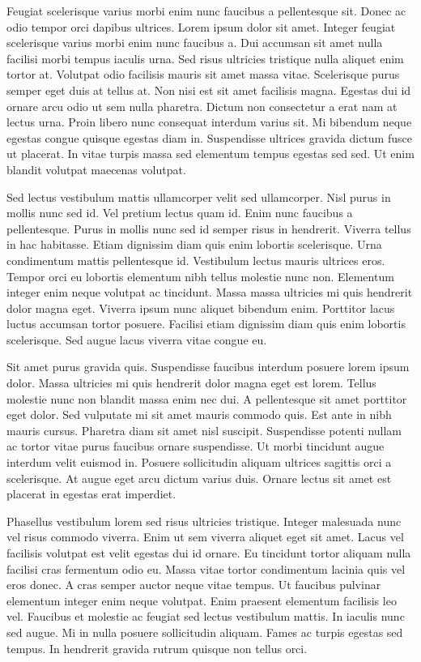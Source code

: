 \documentclass[11pt,a4paper]{article}
\begin{document}
Feugiat scelerisque varius morbi enim nunc faucibus a pellentesque sit. Donec ac odio tempor orci dapibus ultrices. Lorem ipsum dolor sit amet. Integer feugiat scelerisque varius morbi enim nunc faucibus a. Dui accumsan sit amet nulla facilisi morbi tempus iaculis urna. Sed risus ultricies tristique nulla aliquet enim tortor at. Volutpat odio facilisis mauris sit amet massa vitae. Scelerisque purus semper eget duis at tellus at. Non nisi est sit amet facilisis magna. Egestas dui id ornare arcu odio ut sem nulla pharetra. Dictum non consectetur a erat nam at lectus urna. Proin libero nunc consequat interdum varius sit. Mi bibendum neque egestas congue quisque egestas diam in. Suspendisse ultrices gravida dictum fusce ut placerat. In vitae turpis massa sed elementum tempus egestas sed sed. Ut enim blandit volutpat maecenas volutpat.

Sed lectus vestibulum mattis ullamcorper velit sed ullamcorper. Nisl purus in mollis nunc sed id. Vel pretium lectus quam id. Enim nunc faucibus a pellentesque. Purus in mollis nunc sed id semper risus in hendrerit. Viverra tellus in hac habitasse. Etiam dignissim diam quis enim lobortis scelerisque. Urna condimentum mattis pellentesque id. Vestibulum lectus mauris ultrices eros. Tempor orci eu lobortis elementum nibh tellus molestie nunc non. Elementum integer enim neque volutpat ac tincidunt. Massa massa ultricies mi quis hendrerit dolor magna eget. Viverra ipsum nunc aliquet bibendum enim. Porttitor lacus luctus accumsan tortor posuere. Facilisi etiam dignissim diam quis enim lobortis scelerisque. Sed augue lacus viverra vitae congue eu.

Sit amet purus gravida quis. Suspendisse faucibus interdum posuere lorem ipsum dolor. Massa ultricies mi quis hendrerit dolor magna eget est lorem. Tellus molestie nunc non blandit massa enim nec dui. A pellentesque sit amet porttitor eget dolor. Sed vulputate mi sit amet mauris commodo quis. Est ante in nibh mauris cursus. Pharetra diam sit amet nisl suscipit. Suspendisse potenti nullam ac tortor vitae purus faucibus ornare suspendisse. Ut morbi tincidunt augue interdum velit euismod in. Posuere sollicitudin aliquam ultrices sagittis orci a scelerisque. At augue eget arcu dictum varius duis. Ornare lectus sit amet est placerat in egestas erat imperdiet.

Phasellus vestibulum lorem sed risus ultricies tristique. Integer malesuada nunc vel risus commodo viverra. Enim ut sem viverra aliquet eget sit amet. Lacus vel facilisis volutpat est velit egestas dui id ornare. Eu tincidunt tortor aliquam nulla facilisi cras fermentum odio eu. Massa vitae tortor condimentum lacinia quis vel eros donec. A cras semper auctor neque vitae tempus. Ut faucibus pulvinar elementum integer enim neque volutpat. Enim praesent elementum facilisis leo vel. Faucibus et molestie ac feugiat sed lectus vestibulum mattis. In iaculis nunc sed augue. Mi in nulla posuere sollicitudin aliquam. Fames ac turpis egestas sed tempus. In hendrerit gravida rutrum quisque non tellus orci.
\end{document}
